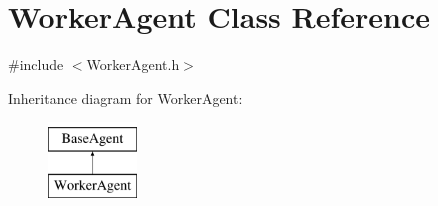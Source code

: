 \hypertarget{class_worker_agent}{\section{Worker\-Agent Class Reference}
\label{class_worker_agent}
}


{\ttfamily \#include $<$Worker\-Agent.\-h$>$}

Inheritance diagram for Worker\-Agent\-:\begin{figure}[H]
\begin{center}
\leavevmode
\includegraphics[height=2.000000cm]{class_worker_agent}
\end{center}
\end{figure}
